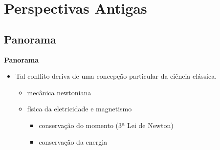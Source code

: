 \section{Perspectivas Antigas}

\subsection{Panorama}
\begin{frame}{\textbf{Panorama}}
 \begin{itemize}
  \item<2->[$\bullet$] Tal conflito deriva de uma \textcolor{NordRed}{concepção particular da ciência clássica.}
   \begin{itemize}
    \item<4-> mecânica newtoniana
    \item<5-> física da eletricidade e magnetismo
     \begin{itemize}
      \item<6->[-] conservação do momento (3ª Lei de Newton)
      \item<7->[-] conservação da energia
     \end{itemize}
  \end{itemize}
 \end{itemize}
\end{frame}

